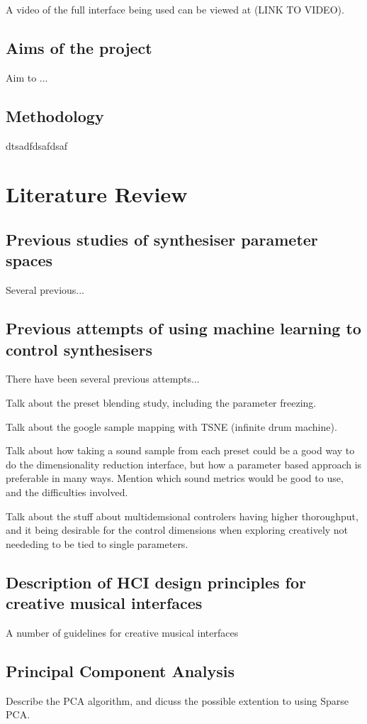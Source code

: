 \documentclass[11pt, oneside]{report}   	%
\begin{document}
A video of the full interface being used can be viewed at (LINK TO VIDEO).
\section{Aims of the project}
Aim to ...


\section{Methodology}
dtsadfdsafdsaf

\chapter{Literature Review}
\section{Previous studies of synthesiser parameter spaces}
Several previous...
\section{Previous attempts of using machine learning to control synthesisers}
There have been several previous attempts...

Talk about the preset blending study, including the parameter freezing.



Talk about the google sample mapping with TSNE (infinite drum machine).

Talk about how taking a sound sample from each preset could be a good way to do the dimensionality reduction interface, but how a parameter based approach is preferable in many ways. Mention which sound metrics would be good to use, and the difficulties involved.

Talk about the stuff about multidemsional controlers having higher thoroughput, and it being desirable for the control dimensions when exploring creatively not neededing to be tied to single parameters.
\section{Description of HCI design principles for creative musical interfaces}
A number of guidelines for creative musical interfaces

\section{Principal Component Analysis}
Describe the PCA algorithm, and dicuss the possible extention to using Sparse PCA. 
\end{document}
